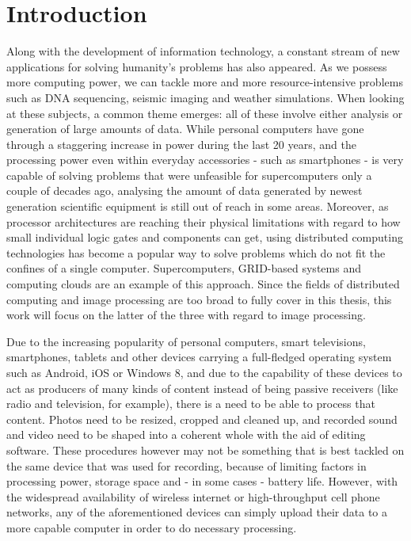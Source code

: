 \documentclass [12pt,a4paper]{report}
\begin{document}

\tableofcontents

\chapter{Introduction}

Along with the development of information technology, a constant stream of new applications for solving humanity's problems has also appeared. As we possess more computing power, we can tackle more and more resource-intensive problems such as DNA sequencing, seismic imaging and weather simulations. When looking at these subjects, a common theme emerges: all of these involve either analysis or generation of large amounts of data. While personal computers have gone through a staggering increase in power during the last 20 years, and the processing power even within everyday accessories - such as smartphones - is very capable of solving problems that were unfeasible for supercomputers only a couple of decades ago, analysing the amount of data generated by newest generation scientific equipment is still out of reach in some areas. Moreover, as processor architectures are reaching their physical limitations with regard to how small individual logic gates and components can get, using distributed computing technologies has become a popular way to solve problems which do not fit the confines of a single computer. Supercomputers, GRID-based systems and computing clouds are an example of this approach. Since the fields of distributed computing and image processing are too broad to fully cover in this thesis, this work will focus on the latter of the three with regard to image processing.

Due to the increasing popularity of personal computers, smart televisions, smartphones, tablets and other devices carrying a full-fledged operating system such as Android, iOS or Windows 8, and due to the capability of these devices to act as producers of many kinds of content instead of being passive receivers (like radio and television, for example), there is a need to be able to process that content. Photos need to be resized, cropped and cleaned up, and recorded sound and video need to be shaped into a coherent whole with the aid of editing software. These procedures however may not be something that is best tackled on the same device that was used for recording, because of limiting factors in processing power, storage space and - in some cases - battery life. However, with the widespread availability of wireless internet or high-throughput cell phone networks, any of the aforementioned devices can simply upload their data to a more capable computer in order to do necessary processing. 
\end{document}
